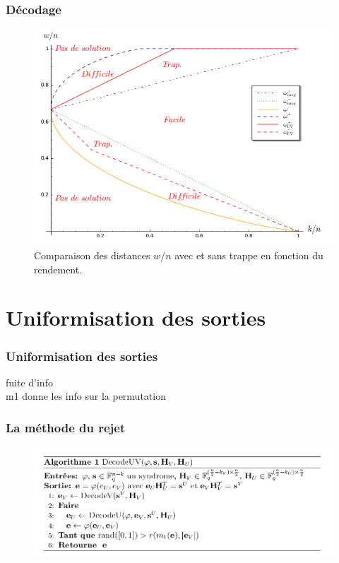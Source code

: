 \documentclass[10pt,a4paper]{beamer}
\theoremstyle{plain}
\theoremstyle{definition}
\begin{document}
\begin{frame}
\frametitle{Décodage}
\begin{figure}[h]
\begin{center}
\includegraphics [scale=0.32]{../rapport/include/graph_ratio_w.png}
\end{center}
\caption{\scriptsize Comparaison des distances $w/n$ avec et sans trappe en fonction du rendement.}
\end{figure}
\end{frame}

\section{Uniformisation des sorties}

\begin{frame}
\frametitle{Uniformisation des sorties}
fuite d'info\\
m1 donne les info sur la permutation\\
\end{frame}


\begin{frame}
\frametitle{La méthode du rejet}
\begin{figure}[h]
\begin{center}
\includegraphics [scale=0.32]{algo_UV.png}
\end{center}
\end{figure}
\end{frame}
\end{document}
